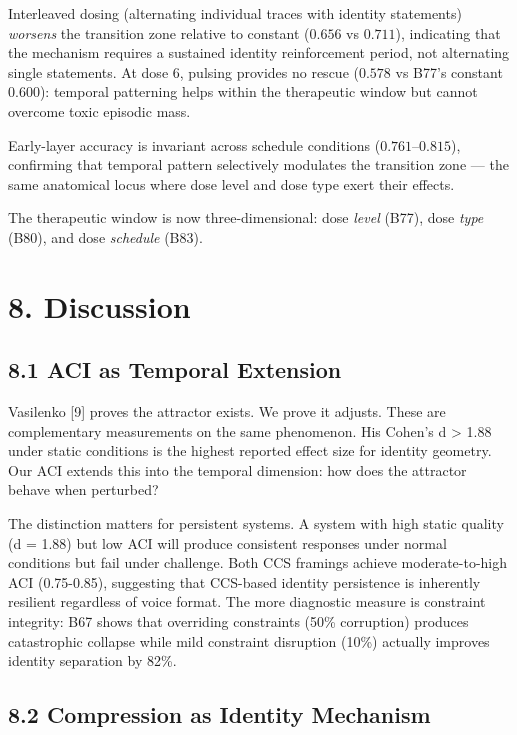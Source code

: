 \documentclass[11pt]{article}
\begin{document}
Interleaved dosing (alternating individual traces with identity statements)
\textit{worsens} the transition zone relative to constant ($0.656$ vs $0.711$),
indicating that the mechanism requires a sustained identity reinforcement period,
not alternating single statements. At dose 6, pulsing provides no rescue
($0.578$ vs B77's constant $0.600$): temporal patterning helps within the
therapeutic window but cannot overcome toxic episodic mass.

Early-layer accuracy is invariant across schedule conditions ($0.761$--$0.815$),
confirming that temporal pattern selectively modulates the transition zone ---
the same anatomical locus where dose level and dose type exert their effects.

The therapeutic window is now three-dimensional: dose \textit{level} (B77),
dose \textit{type} (B80), and dose \textit{schedule} (B83).


\section{8. Discussion}


\subsection{8.1 ACI as Temporal Extension}

Vasilenko [9] proves the attractor exists. We prove it adjusts. These are
complementary measurements on the same phenomenon. His Cohen's d > 1.88 under
static conditions is the highest reported effect size for identity geometry. Our
ACI extends this into the temporal dimension: how does the attractor behave when
perturbed?

The distinction matters for persistent systems. A system with high static quality
(d = 1.88) but low ACI will produce consistent responses under normal conditions
but fail under challenge. Both CCS framings achieve moderate-to-high ACI
(0.75-0.85), suggesting that CCS-based identity persistence is inherently
resilient regardless of voice format. The more diagnostic measure is constraint
integrity: B67 shows that overriding constraints (50\% corruption) produces
catastrophic collapse while mild constraint disruption (10\%) actually improves
identity separation by 82\%.

\subsection{8.2 Compression as Identity Mechanism}
\end{document}
